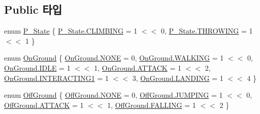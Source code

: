 \subsection*{Public 타입}
\begin{DoxyCompactItemize}
\item 
enum \mbox{\hyperlink{class_player_state_afe68f1a1529955d173ccd309da55001b}{P\+\_\+\+State}} \{ \mbox{\hyperlink{class_player_state_afe68f1a1529955d173ccd309da55001bafc4db29e596cb9d0d1de3cdc00b982f1}{P\+\_\+\+State.\+C\+L\+I\+M\+B\+I\+NG}} = 1 $<$$<$ 0, 
\mbox{\hyperlink{class_player_state_afe68f1a1529955d173ccd309da55001ba118050df28f155ec919c245101f050e5}{P\+\_\+\+State.\+T\+H\+R\+O\+W\+I\+NG}} = 1 $<$$<$ 1
 \}
\item 
enum \mbox{\hyperlink{class_state_ab9eb1c1d81f1903b8486d1275e78b68e}{On\+Ground}} \{ \newline
\mbox{\hyperlink{class_state_ab9eb1c1d81f1903b8486d1275e78b68eab50339a10e1de285ac99d4c3990b8693}{On\+Ground.\+N\+O\+NE}} = 0, 
\mbox{\hyperlink{class_state_ab9eb1c1d81f1903b8486d1275e78b68ea606c114184493a665cf1f6a12fbab9d3}{On\+Ground.\+W\+A\+L\+K\+I\+NG}} = 1 $<$$<$ 0, 
\mbox{\hyperlink{class_state_ab9eb1c1d81f1903b8486d1275e78b68eaa5daf7f2ebbba4975d61dab1c40188c7}{On\+Ground.\+I\+D\+LE}} = 1 $<$$<$ 1, 
\mbox{\hyperlink{class_state_ab9eb1c1d81f1903b8486d1275e78b68eac6ddd0f72ff2fd344693b9ca8d483871}{On\+Ground.\+A\+T\+T\+A\+CK}} = 1 $<$$<$ 2, 
\newline
\mbox{\hyperlink{class_state_ab9eb1c1d81f1903b8486d1275e78b68ea0f85e9fa4c9d9011849fd3bfcae6a2c0}{On\+Ground.\+I\+N\+T\+E\+R\+A\+C\+T\+I\+N\+G1}} = 1 $<$$<$ 3, 
\mbox{\hyperlink{class_state_ab9eb1c1d81f1903b8486d1275e78b68ea7ab0a1cfd85cc3da16cd3e3ad7448524}{On\+Ground.\+L\+A\+N\+D\+I\+NG}} = 1 $<$$<$ 4
 \}
\item 
enum \mbox{\hyperlink{class_state_a7d945e793324c017a973205564cf1a56}{Off\+Ground}} \{ \mbox{\hyperlink{class_state_a7d945e793324c017a973205564cf1a56ab50339a10e1de285ac99d4c3990b8693}{Off\+Ground.\+N\+O\+NE}} = 0, 
\mbox{\hyperlink{class_state_a7d945e793324c017a973205564cf1a56a6de49bfda8068b7bc3b0c0e3d2e43134}{Off\+Ground.\+J\+U\+M\+P\+I\+NG}} = 1 $<$$<$ 0, 
\mbox{\hyperlink{class_state_a7d945e793324c017a973205564cf1a56ac6ddd0f72ff2fd344693b9ca8d483871}{Off\+Ground.\+A\+T\+T\+A\+CK}} = 1 $<$$<$ 1, 
\mbox{\hyperlink{class_state_a7d945e793324c017a973205564cf1a56a4f9d4539ac1e11a251e2afe022eba4e6}{Off\+Ground.\+F\+A\+L\+L\+I\+NG}} = 1 $<$$<$ 2
 \}
\end{DoxyCompactItemize}
